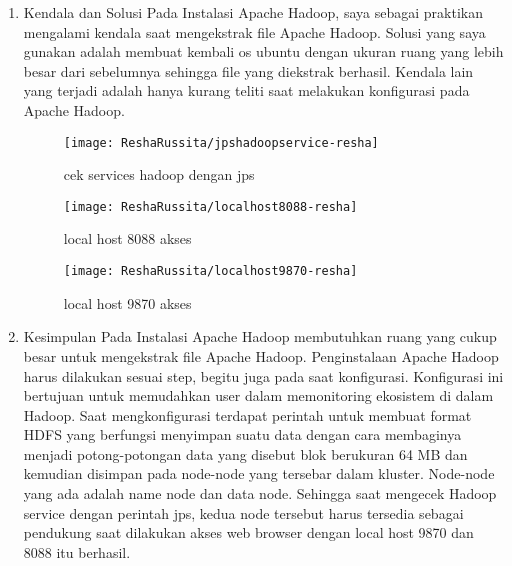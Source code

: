 
\begin{enumerate}
\item Kendala dan Solusi
\newline Pada Instalasi Apache Hadoop, saya sebagai praktikan mengalami kendala saat mengekstrak file Apache Hadoop. Solusi yang saya gunakan adalah membuat kembali os ubuntu dengan ukuran ruang yang lebih besar dari sebelumnya sehingga file yang diekstrak berhasil. 
Kendala lain yang terjadi adalah hanya kurang teliti saat melakukan konfigurasi pada Apache Hadoop.

\begin{figure}[!ht]
\texttt{[image: ReshaRussita/jpshadoopservice-resha]}
\caption{cek services hadoop dengan jps}
\label{gam:perkuliahan-22-09}
\end{figure}

\begin{figure}[!ht]
\texttt{[image: ReshaRussita/localhost8088-resha]}
\caption{local host 8088 akses}
\label{gam:perkuliahan-22-09}
\end{figure}

\begin{figure}[!ht]
\texttt{[image: ReshaRussita/localhost9870-resha]}
\caption{local host 9870 akses}
\label{gam:perkuliahan-22-09}
\end{figure}

\newpage
\item Kesimpulan
\newline Pada Instalasi Apache Hadoop membutuhkan ruang yang cukup besar untuk mengekstrak file Apache Hadoop. Penginstalaan Apache Hadoop harus dilakukan sesuai step, begitu juga pada saat konfigurasi. Konfigurasi ini bertujuan untuk memudahkan user dalam memonitoring ekosistem di dalam Hadoop. Saat mengkonfigurasi terdapat perintah untuk membuat format HDFS yang berfungsi menyimpan suatu data dengan cara membaginya menjadi potong-potongan data yang disebut blok berukuran 64 MB dan kemudian disimpan pada node-node yang tersebar dalam kluster. Node-node yang ada adalah name node dan data node. Sehingga saat mengecek Hadoop service dengan perintah jps, kedua node tersebut harus tersedia sebagai pendukung saat dilakukan akses web browser dengan local host 9870 dan 8088 itu berhasil.
\end{enumerate}


